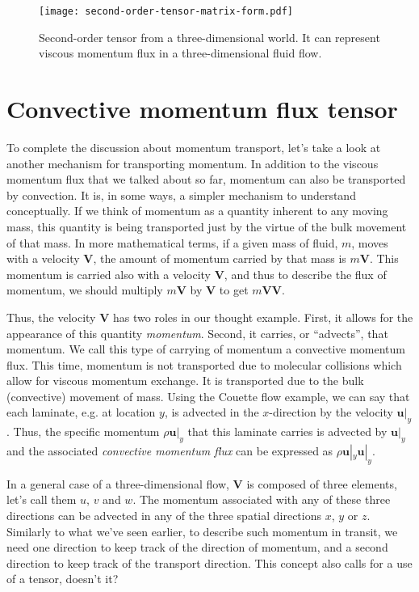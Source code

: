 \documentclass[10pt,twocolumn]{article}
\begin{document}
\begin{figure}[t!]
\centering\texttt{[image: second-order-tensor-matrix-form.pdf]}
\caption{Second-order tensor from a three-dimensional world. It can represent viscous momentum flux in a three-dimensional fluid flow.}
\label{fig:tensor-in-matrix-form}
\end{figure}

\section*{Convective momentum flux tensor}

To complete the discussion about momentum transport, let's take a look at another mechanism for transporting momentum. In addition to the viscous momentum flux that we talked about so far, momentum can also be transported by convection. It is, in some ways, a simpler mechanism to understand conceptually. If we think of momentum as a quantity inherent to any moving mass, this quantity is being transported just by the virtue of the bulk movement of that mass. In more mathematical terms, if a given mass of fluid, $m$, moves with a velocity $\pmb{V}$, the amount of momentum carried by that mass is $m \pmb{V}$. This momentum is carried also with a velocity $\pmb{V}$, and thus to describe the flux of momentum, we should multiply $m \pmb{V}$ by $\pmb{V}$ to get $m \pmb{V} \pmb{V}$.

Thus, the velocity $\pmb{V}$ has two roles in our thought example. First, it allows for the appearance of this quantity \textit{momentum}. Second, it carries, or ``advects'', that momentum. We call this type of carrying of momentum a convective momentum flux. This time, momentum is not transported due to molecular collisions which allow for viscous momentum exchange. It is transported due to the bulk (convective) movement of mass. Using the Couette flow example, we can say that each laminate, e.g. at location $y$, is advected in the $x$-direction by the velocity $\pmb{u}|_y$. Thus, the specific momentum $\rho \pmb{u}|_y$ that this laminate carries is advected by $\pmb{u}|_y$ and the associated \textit{convective momentum flux} can be expressed as $\rho \pmb{u}|_y \pmb{u}|_y$.

In a general case of a three-dimensional flow, $\pmb{V}$ is composed of three elements, let's call them $u$, $v$ and $w$. The momentum associated with any of these three directions can be advected in any of the three spatial directions $x$, $y$ or $z$. Similarly to what we've seen earlier, to describe such momentum in transit, we need one direction to keep track of the direction of momentum, and a second direction to keep track of the transport direction. This concept also calls for a use of a tensor, doesn't it?
\end{document}
